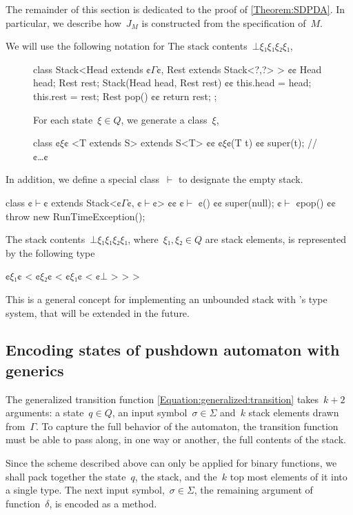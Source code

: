 The remainder of this section is dedicated to the proof of \cref{Theorem:SDPDA}.
In particular, we describe how~$J_M$ is constructed from the
  specification of~$M$.

We will use the following notation for
The stack contents~$⊥ξ₁ξ₁ξ₂ξ₁$,

\begin{figure}[H]
\begin{JAVA}
class Stack<Head extends ¢$Γ$¢, Rest extends Stack<?,?> > {¢¢
  Head head;
  Rest rest;
  Stack(Head head, Rest rest) {¢¢ this.head = head; this.rest = rest;}
  Rest pop() {¢¢ return rest; };
}
\end{JAVA}
For each state~$ξ∈Q$, we generate a \Java class~$ξ$,
\begin{JAVA}
class ¢$ξ$¢ <T extends S> extends S<T> {¢¢
  ¢$ξ$¢(T t) {¢¢ super(t); }
  // ¢…¢
}
\end{JAVA}
\end{figure}
In addition, we define a special class~$\vdash$ to designate the empty stack.
\begin{JAVA}
class ¢$\vdash$¢ extends Stack<¢$Γ$¢, ¢$\vdash$¢> {¢¢
  ¢$\vdash$ ¢() {¢¢ super(null); }
  ¢$\vdash$ ¢pop() {¢¢ throw new RunTimeException(); }
}
\end{JAVA}
The stack contents~$⊥ξ₁ξ₁ξ₂ξ₁$,
where~$ξ₁,ξ₂∈Q$ are stack elements,
is represented by the following type
\begin{JAVA}
  ¢$ξ₁$¢ < ¢$ξ₂$¢ < ¢$ξ₁$¢ < ¢$⊥$ > > >
\end{JAVA}
This is a general concept for implementing an unbounded stack with \Java's type system,
that will be extended in the future.

\subsection{Encoding states of pushdown automaton with \Java generics}
The generalized transition function \cref{Equation:generalized:transition}
  takes~$k+2$ arguments: a state~$q∈Q$, an input symbol~$σ∈Σ$
    and~$k$ stack elements drawn from~$Γ$.
To capture the full behavior of the automaton, the transition function
  must be able to pass along, in one way or another, the full contents of the stack.

Since the scheme described above can only be applied for binary functions,
  we shall pack together the state~$q$, the stack, and the~$k$ top most
  elements of it into a single type.
The next input symbol,~$σ∈Σ$, the remaining argument of function~$δ$,
  is encoded as a method.


